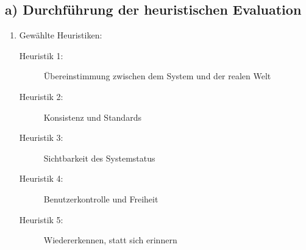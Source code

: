 \documentclass{scrartcl}
\begin{document}
\subsection*{a) Durchführung der heuristischen Evaluation}
\begin{enumerate}
\item Gewählte Heuristiken:
\begin{description}
\item[Heuristik 1:] Übereinstimmung zwischen dem System und der realen Welt
\item[Heuristik 2:] Konsistenz und Standards
\item[Heuristik 3:] Sichtbarkeit des Systemstatus
\item[Heuristik 4:] Benutzerkontrolle und Freiheit
\item[Heuristik 5:] Wiedererkennen, statt sich erinnern
\end{description}


\end{enumerate}
\end{document}
